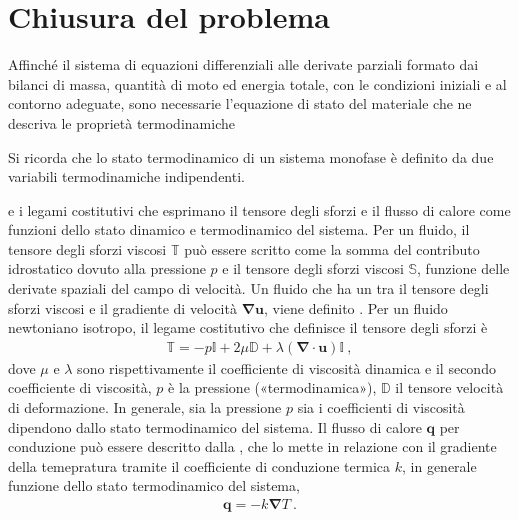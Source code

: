 \documentclass[letterpaper,10pt,italian]{jupyterBook}
\begin{document}
\section{Chiusura del problema}
\label{\detokenize{polimi/fluidmechanics-ita/template/capitoli/04_bilanci/04teoria:chiusura-del-problema}}
\sphinxAtStartPar
Affinché il sistema di equazioni differenziali alle derivate parziali
formato dai bilanci di massa, quantità di moto ed energia totale, con le
condizioni iniziali e al contorno adeguate, sono necessarie l’equazione
di stato del materiale che ne descriva le proprietà termodinamiche%
\begin{footnote}[1]\sphinxAtStartFootnote
Si ricorda che lo stato termodinamico di un sistema monofase è
definito da due variabili termodinamiche indipendenti.
%
\end{footnote} e
i legami costitutivi che esprimano il tensore degli sforzi e il flusso
di calore come funzioni dello stato dinamico e termodinamico del
sistema. Per un fluido, il tensore degli sforzi viscosi \(\mathbb{T}\) può
essere scritto come la somma del contributo idrostatico dovuto alla
pressione \(p\) e il tensore degli sforzi viscosi \(\mathbb{S}\), funzione
delle derivate spaziali del campo di velocità. Un fluido che ha un
 tra il tensore degli sforzi viscosi e il
gradiente di velocità \(\mathbf{\nabla} \mathbf{u}\), viene definito . Per un fluido newtoniano isotropo, il legame costitutivo
che definisce il tensore degli sforzi è
\begin{equation*}
\begin{split}\mathbb{T} = -p \mathbb{I} + 2 \mu \mathbb{D} + \lambda (\mathbf{\nabla} \cdot \mathbf{u}) \mathbb{I} \ ,\end{split}
\end{equation*}
\sphinxAtStartPar
dove \(\mu\) e \(\lambda\) sono rispettivamente il coefficiente di viscosità
dinamica e il secondo coefficiente di viscosità, \(p\) è la pressione
(«termodinamica»), \(\mathbb{D}\) il tensore velocità di deformazione. In
generale, sia la pressione \(p\) sia i coefficienti di viscosità dipendono
dallo stato termodinamico del sistema. Il flusso di calore \(\mathbf{q}\) per
conduzione può essere descritto dalla , che lo mette
in relazione con il gradiente della temepratura tramite il coefficiente
di conduzione termica \(k\), in generale funzione dello stato
termodinamico del sistema,
\begin{equation*}
\begin{split}\mathbf{q} = - k \mathbf{\nabla} T \ .\end{split}
\end{equation*}
\end{document}

